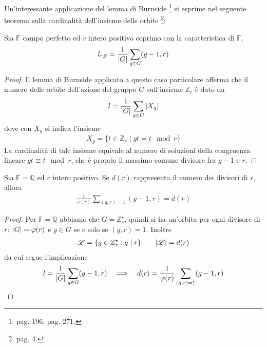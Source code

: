 Un'interessante applicazione del lemma di Burnside
\footnote{\cite{artin} pag. 196, \cite{cattaneo} pag. 271. }
si esprime nel seguente teorema sulla cardinalità dell'insieme delle orbite
\footnote{\cite{cerruti} pag. 4. }:
\begin{teorema}
Sia $\mathbb{F}$ campo perfetto ed $r$ intero positivo coprimo con la caratteristica di $\mathbb{F}$,
\begin{align*}
   l_{r,\mathbb{F}} = \frac{1}{\arrowvert G \arrowvert }\sum_{g \in G} (g-1, r)
\end{align*}
\end{teorema}
\begin{proof}
Il lemma di Burnside applicato a questo caso particolare afferma che il numero delle orbite dell'azione del gruppo $G$ sull'insieme $ \mathbb{Z}_{r}$ è dato da
\begin{align*}
   l = \frac{1}{\arrowvert G \arrowvert }\sum_{g \in G}\arrowvert X_{g} \arrowvert
\end{align*}
dove con $X_{g}$ si indica l'insieme
\begin{align*}
   X_{g} = \lbrace t \in \mathbb{Z}_{r} \mid gt = t \mod r \rbrace
\end{align*}
La cardinalità di tale insieme equivale al numero di soluzioni della congruenza lineare $ gt \equiv t \mod{r}$, che è proprio il massimo comune divisore fra $g-1$ e $r$.
\end{proof}

\begin{corollario}
Sia $\mathbb{F}= \mathbb{Q}$ ed $r$ intero positivo. Se $d(r)$ rappresenta il numero dei divisori di $r$, allora
\begin{align*}
   \frac{1}{\varphi(r) }\sum_{(g,r) = 1} (g-1, r) = d(r)
\end{align*}
\end{corollario}
\begin{proof}
Per $\mathbb{F}= \mathbb{Q}$ abbiamo che $G =\mathbb{Z}_{r}^{\star}$, quindi si ha un'orbita per ogni divisore di $r$: $\arrowvert G \arrowvert = \varphi(r)$ e $g \in G$ se e solo se $(g,r) = 1$. Inoltre
\begin{align*}
   \mathscr{L} = \lbrace g \in \mathbb{Z}_{r}^{\star} : g\mid r \rbrace
   \qquad
   \arrowvert  \mathscr{L} \arrowvert = d(r)
\end{align*}
da cui segue l'implicazione
\begin{align*}
   l = \frac{1}{\arrowvert G \arrowvert }\sum_{g \in G} (g-1, r)
   \quad
   \Longrightarrow
   \quad
   d(r) = \frac{1}{\varphi(r) }\sum_{(g,r) = 1} (g-1, r)
\end{align*}
\end{proof}

